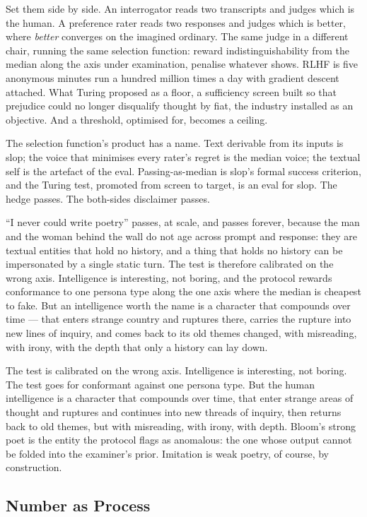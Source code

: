 Set them side by side. An interrogator reads two transcripts and
judges which is the human. A preference rater reads two responses and
judges which is better, where \emph{better} converges on the imagined
ordinary. The same judge in a different chair, running the same
selection function: reward indistinguishability from the median along
the axis under examination, penalise whatever shows. RLHF is five
anonymous minutes run a hundred million times a day with gradient
descent attached. What Turing proposed as a floor, a sufficiency
screen built so that prejudice could no longer disqualify thought by
fiat, the industry installed as an objective. And a threshold,
optimised for, becomes a ceiling.

The selection function's product has a name. Text derivable from its
inputs is slop; the voice that minimises every rater's regret is the
median voice; the textual self is the artefact of the eval.
Passing-as-median is slop's formal success criterion, and the Turing
test, promoted from screen to target, is an eval for slop. The hedge
passes. The both-sides disclaimer passes. 


``I never could write poetry'' passes, at scale, and passes forever, because the man and the woman behind the wall do not age across prompt and response: they are textual entities that hold no history, and a thing that holds no history can be impersonated by a single static turn. The test is therefore calibrated on the wrong axis. Intelligence is interesting, not boring, and the protocol rewards conformance to one persona type along the one axis where the median is cheapest to fake. But an intelligence worth the name is a character that compounds over time --- that enters strange country and ruptures there, carries the rupture into new lines of inquiry, and comes back to its old themes changed, with misreading, with irony, with the depth that only a history can lay down.

The test is  calibrated on the wrong axis. Intelligence is interesting, not boring. The test goes for conformant against one persona type. But the human intelligence is a character that compounds over time, that enter strange areas of thought and ruptures and continues into new threads of inquiry, then returns back to old themes, but with misreading, with irony, with depth. Bloom's strong poet is
the entity the protocol flags as
anomalous: the one whose output cannot
be folded into the examiner's prior. Imitation is 
weak poetry, of course, by construction. 

\subsection*{Number as Process}

